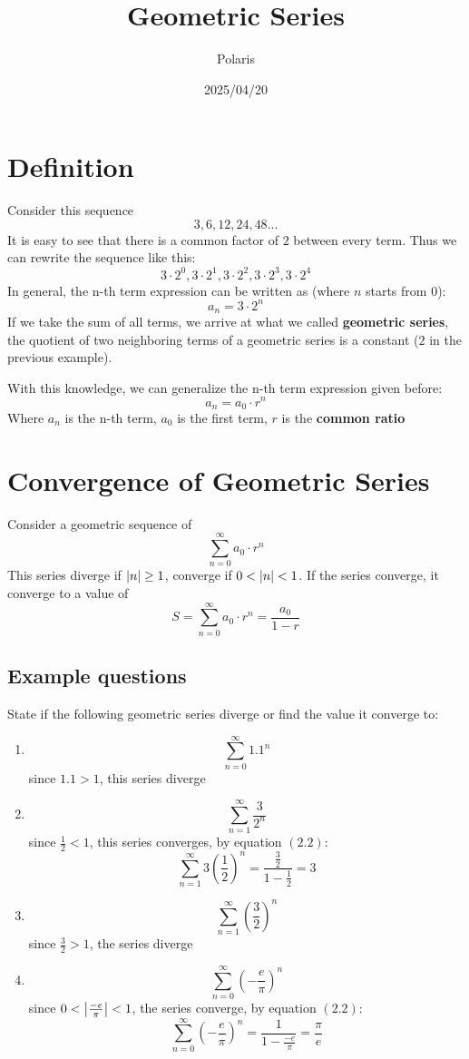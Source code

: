 \documentclass{article}
\title{Geometric Series}
\author{Polaris}
\date{2025/04/20}
\numberwithin{equation}{section}
\begin{document}
\maketitle

\section{Definition}
Consider this sequence
\[
\text{{$3,6,12,24,48$...}}
\]
It is easy to see that there is a common factor of $2$ between every term.
Thus we can rewrite the sequence like this:
\[
\text{{$3\cdot 2^0, 3\cdot 2^1, 3\cdot 2^2, 3\cdot 2^3, 3\cdot 2^4$}}
\]
In general, the n-th term expression can be written as (where $n$ starts from 0):
\[
a_n = 3\cdot 2^n
\]
If we take the sum of all terms, we arrive at what we called \textbf{geometric series},
the quotient of two neighboring terms of a geometric series is a constant ($2$ in the previous example).

With this knowledge, we can generalize the n-th term expression given before:
\[
a_n = a_0 \cdot r^n
\]
Where $a_n$ is the n-th term, $a_0$ is the first term, $r$ is the \textbf{common ratio}

\section{Convergence of Geometric Series}
Consider a geometric sequence of
\[
\sum_{n=0}^{\infty} a_0 \cdot r^n
\]
This series diverge if $\abs{n} \geq 1$, converge if $0 < \abs{n} < 1$. If the series converge, it converge
to a value of 
\[
S = \sum_{n=0}^{\infty} a_0 \cdot r^n = \frac{a_0}{1-r}
\]

\subsection{Example questions}
State if the following geometric series diverge or find the value it converge to:
\begin{enumerate}
    \item \[\sum_{n = 0}^\infty 1.1^n \]
    since $1.1 > 1$, this series diverge

    \item \[\sum_{n = 1}^\infty \frac{3}{2^n} \]
    since $\frac{1}{2} < 1$, this series converges, by equation $(2.2)$:
    \[
    \sum_{n = 1}^{\infty} 3\left(\frac{1}{2}\right)^n = \frac{\frac{3}{2}}{1-\frac{1}{2}} = 3
    \]

    \item \[\sum_{n = 1}^{\infty} \left(\frac{3}{2} \right)^n \]
    since $\frac{3}{2} > 1$, the series diverge

    \item  \[\sum_{n = 0}^{\infty} \left( -\frac{e}{\pi}\right)^n\]
    since $0 < \abs{\frac{-e}{\pi}} < 1$, the series converge, by equation $(2.2)$:
    \[
        \sum_{n = 0}^{\infty} \left( -\frac{e}{\pi}\right)^n = \frac{1}{1 - \frac{-e}{\pi}} = \frac{\pi}{e}
    \]
\end{enumerate}
\end{document}
